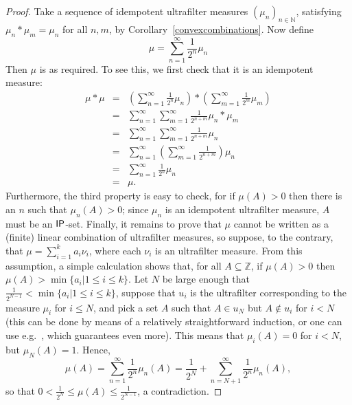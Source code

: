 \documentclass{jloganal}
\theoremstyle{definition}
\newcommand{\ip}{\mathnormal{\mathsf{IP}}}
\begin{document}
\begin{proof}
Take a sequence of idempotent ultrafilter measures $(\mu_n)_{n\in\mathbb N}$, satisfying $\mu_n*\mu_m=\mu_n$ for all $n,m$, by Corollary~\ref{convexcombinations}. Now define
\begin{equation*}
\mu=\sum_{n=1}^{\infty}\frac{1}{2^{n}}\mu_{n}   
\end{equation*}
Then $\mu$ is as required. To see this, we first check that it is an idempotent measure:
\begin{eqnarray*}
    \mu*\mu & = & \left(\sum_{n=1}^{\infty}\frac{1}{2^{n}}\mu_{n}\right)*\left(\sum_{m=1}^{\infty}\frac{1}{2^{m}}\mu_{m}\right) \\
    & = & \sum_{n=1}^{\infty}\sum_{m=1}^{\infty}\frac{1}{2^{n+m}}\mu_{n}*\mu_{m} \\
    & = & \sum_{n=1}^{\infty}\sum_{m=1}^{\infty}\frac{1}{2^{n+m}}\mu_{n} \\
    & = & \sum_{n=1}^{\infty}\left(\sum_{m=1}^{\infty}\frac{1}{2^{n+m}}\right)\mu_{n} \\
    & = & \sum_{n=1}^{\infty}\frac{1}{2^{n}}\mu_{n} \\
    & = & \mu.
\end{eqnarray*}
Furthermore, the third property is easy to check, for if $\mu(A)>0$ then there is an $n$ such that $\mu_n(A)>0$; since $\mu_n$ is an idempotent ultrafilter measure, $A$ must be an $\ip$-set. Finally, it remains to prove that $\mu$ cannot be written as a (finite) linear combination of ultrafilter measures, so suppose, to the contrary, that $\mu=\sum_{i=1}^k a_i \nu_i$, where each $\nu_i$ is an ultrafilter measure. From this assumption, a simple calculation shows that, for all $A\subseteq\mathbb Z$, if $\mu(A)>0$ then $\mu(A)>\min\{a_i\big|1\leq i\leq k\}$. Let $N$ be large enough that $\frac{1}{2^{N-1}}<\min\{a_i\big|1\leq i\leq k\}$, suppose that $u_i$ is the ultrafilter corresponding to the measure $\mu_i$ for $i\leq N$, and pick a set $A$ such that $A\in u_N$ but $A\notin u_i$ for $i<N$ (this can be done by means of a relatively straightforward induction, or one can use e.g.~\cite[Lemma 3.4]{fernandez-navarro-soria}, which guarantees even more). This means that $\mu_i(A)=0$ for $i<N$, but $\mu_N(A)=1$. Hence, 
\begin{equation*}
    \mu(A)=\sum_{n=1}^\infty \frac{1}{2^n}\mu_n(A)=\frac{1}{2^N}+\sum_{n=N+1}^\infty\frac{1}{2^n}\mu_n(A),
\end{equation*}
so that $0<\frac{1}{2^N}\leq\mu(A)\leq\frac{1}{2^{N-1}}$, a contradiction.
\end{proof}
\end{document}
